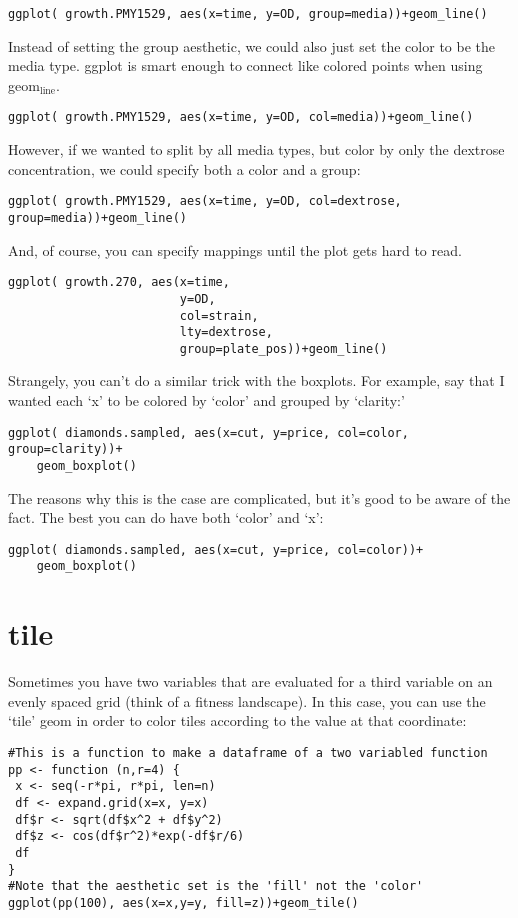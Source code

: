 \documentclass[11pt]{article}
\begin{document}
\begin{verbatim}
ggplot( growth.PMY1529, aes(x=time, y=OD, group=media))+geom_line()
\end{verbatim}


Instead of setting the group aesthetic, we could also just set the
color to be the media type. ggplot is smart enough to connect like
colored points when using geom$_{\mathrm{line}}$.

\begin{verbatim}
ggplot( growth.PMY1529, aes(x=time, y=OD, col=media))+geom_line()
\end{verbatim}


However, if we wanted to split by all media types, but color by only the
dextrose concentration, we could specify both a color and a group:

\begin{verbatim}
ggplot( growth.PMY1529, aes(x=time, y=OD, col=dextrose, group=media))+geom_line()
\end{verbatim}


And, of course, you can specify mappings until the plot gets hard to read.

\begin{verbatim}
ggplot( growth.270, aes(x=time,
                        y=OD,
                        col=strain,
                        lty=dextrose,
                        group=plate_pos))+geom_line()
\end{verbatim}


Strangely, you can't do a similar trick with the boxplots. For
example, say that I wanted each `x' to be colored by `color' and
grouped by `clarity:'

\begin{verbatim}
ggplot( diamonds.sampled, aes(x=cut, y=price, col=color, group=clarity))+
    geom_boxplot()
\end{verbatim}


The reasons why this is the case are complicated, but it's good to be
aware of the fact. The best you can do have both `color' and `x':

\begin{verbatim}
ggplot( diamonds.sampled, aes(x=cut, y=price, col=color))+
    geom_boxplot()
\end{verbatim}
\section{tile}
\label{sec-7}


Sometimes you have two variables that are evaluated for a third
variable on an evenly spaced grid (think of a fitness landscape). In
this case, you can use the `tile' geom in order to color tiles
according to the value at that coordinate:

\begin{verbatim}
#This is a function to make a dataframe of a two variabled function
pp <- function (n,r=4) {
 x <- seq(-r*pi, r*pi, len=n)
 df <- expand.grid(x=x, y=x)
 df$r <- sqrt(df$x^2 + df$y^2)
 df$z <- cos(df$r^2)*exp(-df$r/6)
 df
}
#Note that the aesthetic set is the 'fill' not the 'color'
ggplot(pp(100), aes(x=x,y=y, fill=z))+geom_tile()
\end{verbatim}
\end{document}
